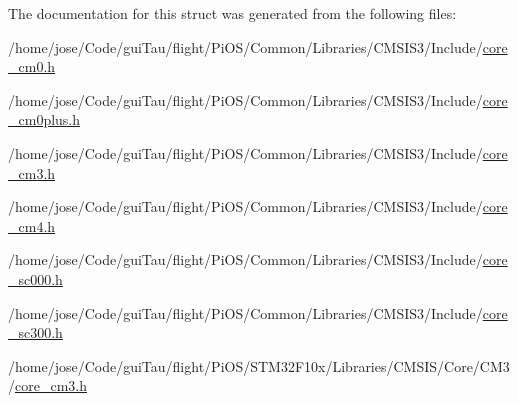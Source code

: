 The documentation for this struct was generated from the following files\-:\begin{DoxyCompactItemize}
\item 
/home/jose/\-Code/gui\-Tau/flight/\-Pi\-O\-S/\-Common/\-Libraries/\-C\-M\-S\-I\-S3/\-Include/\hyperlink{core__cm0_8h}{core\-\_\-cm0.\-h}\item 
/home/jose/\-Code/gui\-Tau/flight/\-Pi\-O\-S/\-Common/\-Libraries/\-C\-M\-S\-I\-S3/\-Include/\hyperlink{core__cm0plus_8h}{core\-\_\-cm0plus.\-h}\item 
/home/jose/\-Code/gui\-Tau/flight/\-Pi\-O\-S/\-Common/\-Libraries/\-C\-M\-S\-I\-S3/\-Include/\hyperlink{_common_2_libraries_2_c_m_s_i_s3_2_include_2core__cm3_8h}{core\-\_\-cm3.\-h}\item 
/home/jose/\-Code/gui\-Tau/flight/\-Pi\-O\-S/\-Common/\-Libraries/\-C\-M\-S\-I\-S3/\-Include/\hyperlink{core__cm4_8h}{core\-\_\-cm4.\-h}\item 
/home/jose/\-Code/gui\-Tau/flight/\-Pi\-O\-S/\-Common/\-Libraries/\-C\-M\-S\-I\-S3/\-Include/\hyperlink{core__sc000_8h}{core\-\_\-sc000.\-h}\item 
/home/jose/\-Code/gui\-Tau/flight/\-Pi\-O\-S/\-Common/\-Libraries/\-C\-M\-S\-I\-S3/\-Include/\hyperlink{core__sc300_8h}{core\-\_\-sc300.\-h}\item 
/home/jose/\-Code/gui\-Tau/flight/\-Pi\-O\-S/\-S\-T\-M32\-F10x/\-Libraries/\-C\-M\-S\-I\-S/\-Core/\-C\-M3/\hyperlink{_s_t_m32_f10x_2_libraries_2_c_m_s_i_s_2_core_2_c_m3_2core__cm3_8h}{core\-\_\-cm3.\-h}\end{DoxyCompactItemize}
